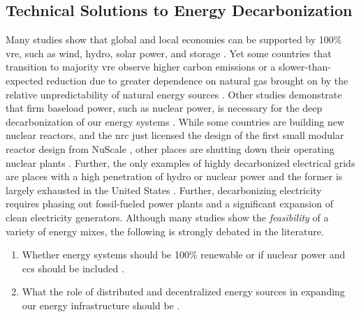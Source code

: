 \subsection{Technical Solutions to Energy Decarbonization}

Many studies show that global and local economies can be supported by 100\%
\ac{vre}, such as wind, hydro, solar power, and storage \cite{jacobson_100_2015,
bussar_optimal_2014,brown_response_2018,dorotic_integration_2019,wallsgrove_emerging_2021,
cochran_la100_2021,cosic_100_2012,traber_economically_2021,bogdanov_full_2021,
bogdanov_north-east_2016,
esteban_100_2018,yue_least_2020,neumann_near-optimal_2021}. Yet some countries
that transition to majority \ac{vre} observe higher carbon emissions or a
slower-than-expected reduction due to greater dependence on natural gas brought
on by the relative unpredictability of natural energy sources
\cite{wagner_co2_2021}. Other studies demonstrate that firm baseload power, such
as nuclear power, is necessary for the deep decarbonization of our energy
systems
\cite{wagner_co2_2021,shaner_geophysical_2018,dotson_influence_2022,greene_enhancing_2019,kim_carbon_2021,
lehtveer_how_2015,vaillancourt_role_2008,
de_sisternes_value_2016,alzbutas_uncertainty_2012,brook_why_2014,
epiney_economic_2020,petti_future_2018, patrizio_socially_2020}. While some
countries are building new nuclear reactors, and the \ac{nrc} just licensed the
design of the first small modular reactor design from NuScale
\cite{office_of_nuclear_energy_science_and_technology_nrc_2023}, other places
are shutting down their operating nuclear plants \cite{johnson_new_2021}. 
Further, the only examples of highly decarbonized electrical grids are places
with a high penetration of hydro or nuclear power and the former is largely
exhausted in the United States \cite{lopez_us_2012}. Further, decarbonizing
electricity requires phasing out fossil-fueled power plants and a significant
expansion of clean electricity generators. Although many studies show the
\textit{feasibility} of a variety of energy mixes, the following is strongly
debated in the literature.
\begin{enumerate}
    \item Whether energy systems should be 100\% renewable or if nuclear power
    and \ac{ccs} should be included \cite{heard_burden_2017,
    brown_response_2018,elmallah_frontlining_2022, brook_why_2014}.
    \item What the role of distributed and decentralized energy sources in
    expanding our energy infrastructure should be
    \cite{pitt_assessing_2015,rinaldi_what_2022,parag_electricity_2016,wang_modeling_2020,
    morvaj_decarbonizing_2017,gilbert_can_2020,li_economic_2016,falke_multi-objective_2016}.
\end{enumerate}
